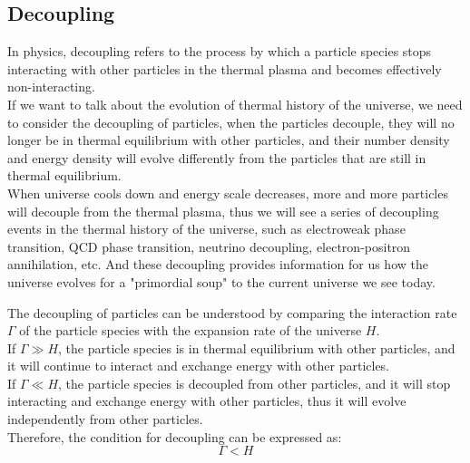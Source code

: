 \clearpage
\subsection{Decoupling}
\begin{intuition}
    In physics, decoupling refers to the process by which a particle species stops interacting with other particles in the thermal plasma and becomes effectively non-interacting. \\

    If we want to talk about the evolution of thermal history of the universe, we need to consider the decoupling of particles, when the particles decouple, they will no longer be in thermal equilibrium with other particles, and their number density and energy density will evolve differently from the particles that are still in thermal equilibrium. \\

    When universe cools down and energy scale decreases, more and more particles will decouple from the thermal plasma, thus we will see a series of decoupling events in the thermal history of the universe, such as electroweak phase transition, QCD phase transition, neutrino decoupling, electron-positron annihilation, etc. And these decoupling provides information for us how the universe evolves for a "primordial soup" to the current universe we see today.
\end{intuition}

\bigskip\noindent
\begin{intuition}
    The decoupling of particles can be understood by comparing the interaction rate $\Gamma$ of the particle species with the expansion rate of the universe $H$. \\

    If $\Gamma \gg H$, the particle species is in thermal equilibrium with other particles, and it will continue to interact and exchange energy with other particles. \\

    If $\Gamma \ll H$, the particle species is decoupled from other particles, and it will stop interacting and exchange energy with other particles, thus it will evolve independently from other particles. \\

    Therefore, the condition for decoupling can be expressed as:
    \[
        \Gamma < H
    \]
\end{intuition}

\clearpage
